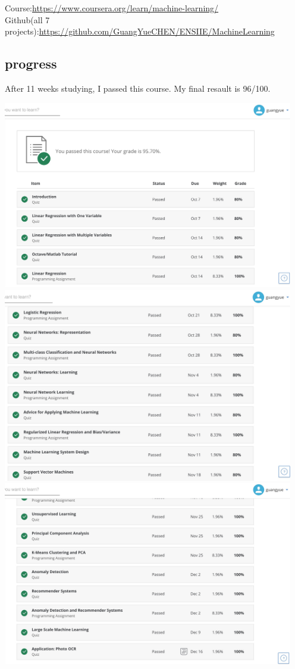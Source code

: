 \documentclass[a4paper]{article}
\begin{document}
Course:\href{https://www.coursera.org/learn/machine-learning/}{https://www.coursera.org/learn/machine-learning/} \\
Github(all 7 projects):\href{https://github.com/GuangYueCHEN/ENSIIE/tree/master/Plus/MachineLearning}{https://github.com/GuangYueCHEN/ENSIIE/MachineLearning} 

\subsection{progress}
After 11 weeks studying, I passed this course. My final resault is 96/100.
\begin{center}
\includegraphics[width=5in]{res1.png}
\includegraphics[width=5in]{res2.png}
\includegraphics[width=5in]{res3.png}
\end{center}
\end{document}
